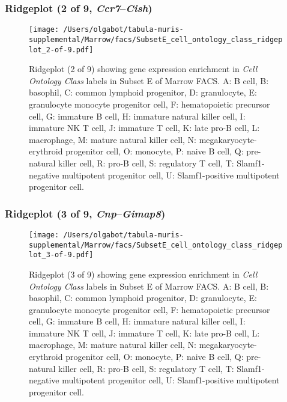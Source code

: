 \subsubsection{Ridgeplot (2 of 9, \emph{Ccr7}--\emph{Cish})}
\begin{figure}[h]
\centering
\texttt{[image: /Users/olgabot/tabula-muris-supplemental/Marrow/facs/SubsetE\_cell\_ontology\_class\_ridgeplot\_2-of-9.pdf]}

\caption{ Ridgeplot (2 of 9)  showing gene expression enrichment in \emph{Cell Ontology Class} labels in Subset E of Marrow FACS. A: B cell, B: basophil, C: common lymphoid progenitor, D: granulocyte, E: granulocyte monocyte progenitor cell, F: hematopoietic precursor cell, G: immature B cell, H: immature natural killer cell, I: immature NK T cell, J: immature T cell, K: late pro-B cell, L: macrophage, M: mature natural killer cell, N: megakaryocyte-erythroid progenitor cell, O: monocyte, P: naive B cell, Q: pre-natural killer cell, R: pro-B cell, S: regulatory T cell, T: Slamf1-negative multipotent progenitor cell, U: Slamf1-positive multipotent progenitor cell.}
\end{figure}


\clearpage

\subsubsection{Ridgeplot (3 of 9, \emph{Cnp}--\emph{Gimap8})}
\begin{figure}[h]
\centering
\texttt{[image: /Users/olgabot/tabula-muris-supplemental/Marrow/facs/SubsetE\_cell\_ontology\_class\_ridgeplot\_3-of-9.pdf]}

\caption{ Ridgeplot (3 of 9)  showing gene expression enrichment in \emph{Cell Ontology Class} labels in Subset E of Marrow FACS. A: B cell, B: basophil, C: common lymphoid progenitor, D: granulocyte, E: granulocyte monocyte progenitor cell, F: hematopoietic precursor cell, G: immature B cell, H: immature natural killer cell, I: immature NK T cell, J: immature T cell, K: late pro-B cell, L: macrophage, M: mature natural killer cell, N: megakaryocyte-erythroid progenitor cell, O: monocyte, P: naive B cell, Q: pre-natural killer cell, R: pro-B cell, S: regulatory T cell, T: Slamf1-negative multipotent progenitor cell, U: Slamf1-positive multipotent progenitor cell.}
\end{figure}


\clearpage

